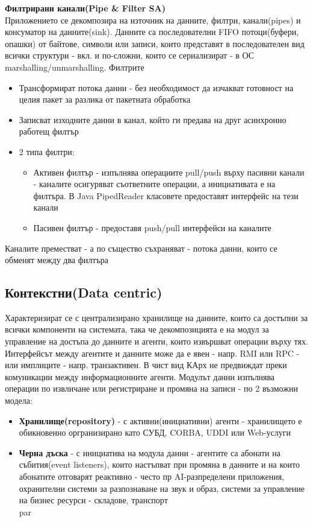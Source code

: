 \documentclass[11pt]{article} %
\begin{document}
\textbf{Филтрирани канали(Pipe \& Filter SA)}\\
Приложението се декомпозира на източник на данните, филтри, канали(pipes) и консуматор на данните(sink). Данните са последователни FIFO потоци(буфери, опашки) от байтове, символи или записи, които представят в последователен вид всички структури - вкл. и по-сложни, които се сериализират - в ОС marshalling/unmarshalling. Филтрите
\begin{itemize}[noitemsep]
	\item Трансформират потока данни - без необходимост да изчакват готовност на целия пакет за разлика от пакетната обработка
	\item Записват изходните данни в канал, който ги предава на друг асинхронно работещ филтър
	\item 2 типа филтри:
	\begin{itemize}[noitemsep]
		\item Активен филтър - изпълнява операциите pull/push върху пасивни канали - каналите осигуряват съответните операции, а инициативата е на филтъра. В Java PipedReader класовете предоставят интерфейс на тези канали
		\item Пасивен филтър - предоставя push/pull интерфейси на каналите\\
	\end{itemize}
\end{itemize}
Каналите преместват - а по същество съхраняват - потока данни, които се обменят между два филтъра

\subsection{Контекстни(Data centric)}
Характеризират се с централизирано хранилище на данните, които са достъпни за всички компоненти на системата, така че декомпозицията е на модул за управление на достъпа до данните и агенти, които извършват операции върху тях. Интерфейсът между агентите и данните може да е явен - напр. RMI или RPC - или имплиците - напр. транзактивен. В чист вид КАрх не предвиждат преки комуникации между информационните агенти. Модулът данни изпълнява операции по извличане или регистриране и промяна на записи - по 2 възможни модела:
\begin{itemize}[noitemsep]
	\item \textbf{Хранилище(repository)} - с активни(инициативни) агенти - хранилището е обикновенно оргранизирано като СУБД, CORBA, UDDI или Web-услуги
	\item \textbf{Черна дъска} - с инициатива на модула данни - агентите са абонати на събития(event listeners), които настъпват при промяна в данните и на които абонатите отговарят реактивно - често пр AI-разпределени приложения, охранителни системи за разпознаване на звук и образ, системи за управление на бизнес ресурси - складове, транспорт\\par
\end{itemize}
\end{document}

